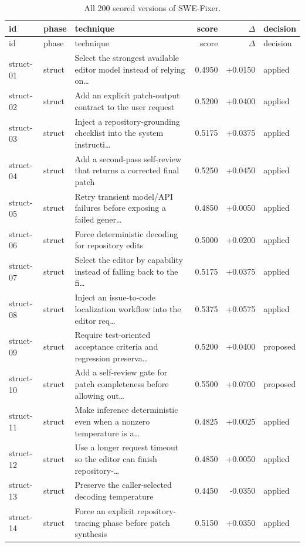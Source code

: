 \begin{center}\scriptsize\begin{longtable}{llp{5.2cm}rrl}
\caption{All 200 scored versions of SWE-Fixer.}\\
\toprule id & phase & technique & score & $\Delta$ & decision \\ \midrule \endfirsthead
\toprule id & phase & technique & score & $\Delta$ & decision \\ \midrule \endhead
struct-01 & struct & Select the strongest available editor model instead of relying on\ldots{} & 0.4950 & +0.0150 & applied \\
struct-02 & struct & Add an explicit patch-output contract to the user request & 0.5200 & +0.0400 & applied \\
struct-03 & struct & Inject a repository-grounding checklist into the system instructi\ldots{} & 0.5175 & +0.0375 & applied \\
struct-04 & struct & Add a second-pass self-review that returns a corrected final patch & 0.5250 & +0.0450 & applied \\
struct-05 & struct & Retry transient model/API failures before exposing a failed gener\ldots{} & 0.4850 & +0.0050 & applied \\
struct-06 & struct & Force deterministic decoding for repository edits & 0.5000 & +0.0200 & applied \\
struct-07 & struct & Select the editor by capability instead of falling back to the fi\ldots{} & 0.5175 & +0.0375 & applied \\
struct-08 & struct & Inject an issue-to-code localization workflow into the editor req\ldots{} & 0.5375 & +0.0575 & applied \\
struct-09 & struct & Require test-oriented acceptance criteria and regression preserva\ldots{} & 0.5200 & +0.0400 & proposed \\
struct-10 & struct & Add a self-review gate for patch completeness before allowing out\ldots{} & 0.5500 & +0.0700 & proposed \\
struct-11 & struct & Make inference deterministic even when a nonzero temperature is a\ldots{} & 0.4825 & +0.0025 & applied \\
struct-12 & struct & Use a longer request timeout so the editor can finish repository-\ldots{} & 0.4850 & +0.0050 & applied \\
struct-13 & struct & Preserve the caller-selected decoding temperature & 0.4450 & -0.0350 & applied \\
struct-14 & struct & Force an explicit repository-tracing phase before patch synthesis & 0.5150 & +0.0350 & applied \\

\end{longtable}
\end{center}
